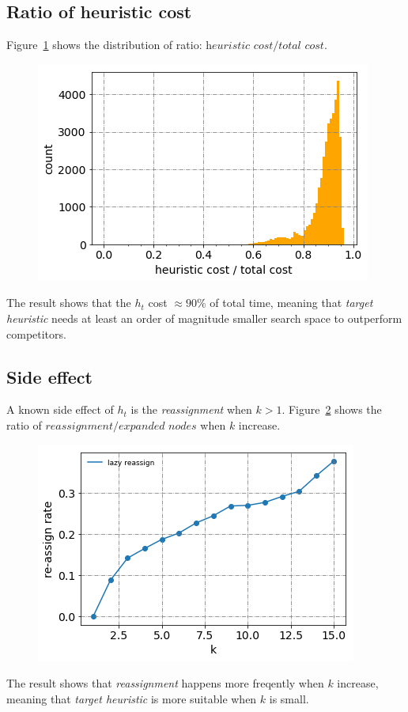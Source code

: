 \subsection{Ratio of heuristic cost}
Figure~\ref{hcost} shows the distribution of ratio:
$\textit{heuristic cost} / \textit{total cost}$.
\begin{figure}[!htp]
  \centering
  \includegraphics[width=.5\linewidth]{./pic/hcost.png}
  \caption{}
  \label{hcost}
\end{figure}
The result shows that the $h_t$ cost $\approx 90\%$ of total time, meaning that
\textit{target heuristic} needs at least an order of magnitude smaller search space 
to outperform competitors.

\subsection{Side effect}
A known side effect of $h_t$ is the \textit{reassignment} when $k>1$.
Figure~\ref{lazy_reassign} shows the ratio of $\textit{reassignment} / \textit{expanded nodes}$ when $k$ increase.
\begin{figure}[!htp]
  \centering
  \includegraphics[width=.5\linewidth]{./pic/lazy_reassign.png}
  \caption{}
  \label{lazy_reassign}
\end{figure}
The result shows that \textit{reassignment} happens more freqently when $k$
increase, meaning that \textit{target heuristic} is more suitable when $k$ is small.

